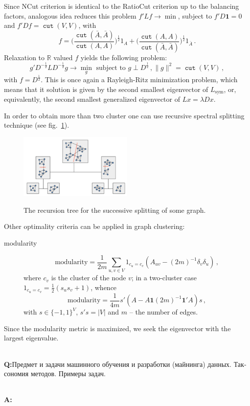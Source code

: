 \documentclass[a4paper]{article}
\newcommand{\Real}{\mathbb{R}}
\newcommand{\cut}{\mathop{\mathtt{cut}}\nolimits}
\newcommand{\one}{\mathbf{1}}
\newcommand{\rus}[1]{\foreignlanguage{russian}{#1}}
\begin{document}
Since NCut criterion is identical to the RatioCut criterion up to the balancing
factors, analogous idea reduces this problem $f'Lf \to \min$, subject to $f'D\one = 0$
and $f'Df = \cut(V,V)$, with 
$$ f
    = \biggl(\frac{\cut(\bar{A},\bar{A})}{\cut(A,A)}\biggr)^\frac{1}{2} 1_A
    + \biggl(\frac{\cut(A,A)}{\cut(\bar{A},\bar{A})}\biggr)^\frac{1}{2} 1_{\bar{A}}
    \,. $$
Relaxation to $\Real$ valued $f$ yields the following problem:
$$ g' D^{-\frac{1}{2}} L D^{-\frac{1}{2}} g \to \min_g
    \text{ subject to } g\perp D^\frac{1}{2}\,,
    \|g\|^2 = \cut(V,V)
    \,, $$
with $f=D^\frac{1}{2}$. This is once again a Rayleigh-Ritz minimization problem, which 
means that it solution is given by the second smallest eigenvector of $L_\text{sym}$,
or, equivalently, the second smallest generalized eigenvector of $Lx = \lambda D x$.


In order to obtain more than two cluster one can use recursive spectral splitting
technique (see fig.~\ref{fig:recursive_split}).
\begin{figure}
    \centering
    \includegraphics[width=0.5\textwidth]{recursive_split.png}
    \label{fig:recursive_split}
    \caption{The recursion tree for the successive splitting of some graph.}
\end{figure}

Other optimality criteria can be applied in graph clustering: \begin{description}
    \item[modularity]
    $$ \text{modularity} =
        \frac{1}{2m} \sum_{u,v\in V} 1_{c_u=c_v}
            (A_{uv} - (2m)^{-1} \delta_v \delta_u)\,,$$
    where $c_v$ is the cluster of the node $v$; in a two-cluster case $1_{c_u=c_v}
    = \frac{1}{2}(s_u s_v + 1)$, whence
    $$ \text{modularity} = \frac{1}{4m} s'(A - A \one (2m)^{-1} \one'A) s\,,$$
    with $s\in \{-1,1\}^V$, $s's = |V|$ and $m$ -- the number of edges.
\end{description}
Since the modularity metric is maximized, we seek the eigenvector with the largest eigenvalue.

\hfill\\\textbf{Q:}\rus{Предмет и задачи машинного обучения и разработки (майнинга)
данных. Таксономия методов. Примеры задач.}

\hfill\\\textbf{A:}

\end{document}
